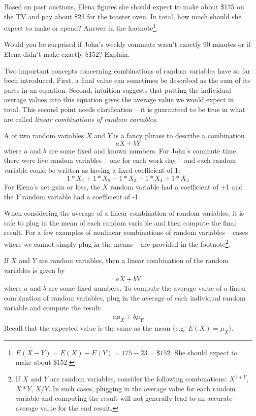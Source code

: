 \begin{exercise}
Based on past auctions, Elena figures she should expect to make about \$175 on the TV and pay about \$23 for the toaster oven. In total, how much should she expect to make or spend? Answer in the footnote\footnote{$E(X-Y) = E(X) - E(Y) = 175 - 23 = \$152$. She should expect to make about \$152.}.
\end{exercise}

\begin{exercise} \label{explainWhyThereIsUncertaintyInTheSum}
Would you be surprised if John's weekly commute wasn't exactly 90 minutes or if Elena didn't make exactly \$152? Explain.
\end{exercise}

Two important concepts concerning combinations of random variables have so far been introduced. First, a final value can sometimes be described as the sum of its parts in an equation. Second, intuition suggests that putting the individual average values into this equation gives the average value we would expect in total. This second point needs clarification -- it is guaranteed to be true in what are called \emph{linear combinations of random variables}.

A  of two random variables $X$ and $Y$ is a fancy phrase to describe a combination
$$ aX + bY$$
where $a$ and $b$ are some fixed and known numbers. For John's commute time, there were five random variables -- one for each work day -- and each random variable could be written as having a fixed coefficient of 1:
$$ 1*X_1 + 1*X_2 + 1*X_3 + 1*X_4 + 1*X_5 $$
For Elena's net gain or loss, the $X$ random variable had a coefficient of +1 and the $Y$ random variable had a coefficient of -1.

When considering the average of a linear combination of random variables, it is safe to plug in the mean of each random variable and then compute the final result. For a few examples of nonlinear combinations of random variables -- cases where we cannot simply plug in the means -- are provided in the footnote\footnote{If $X$ and $Y$ are random variables, consider the following combinations: $X^{1+Y}$, $X*Y$, $X/Y$. In such cases, plugging in the average value for each random variable and computing the result will not generally lead to an accurate average value for the end result.}.

\begin{termBox}{
If $X$ and $Y$ are random variables, then a linear combination of the random variables is given by
\begin{align}\label{linComboOfRandomVariablesXAndY}
aX + bY
\end{align}
where $a$ and $b$ are some fixed numbers. To compute the average value of a linear combination of random variables, plug in the average of each individual random variable and compute the result:
\begin{align*}
a\mu_{X} + b\mu_{Y}
\end{align*}
Recall that the expected value is the same as the mean (e.g. $E(X) = \mu_X$).}
\end{termBox}

